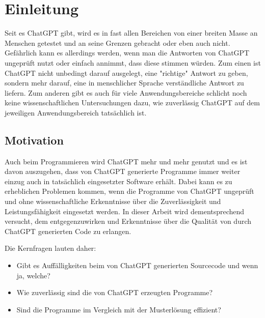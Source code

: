 \documentclass[class=scrbook, crop=false]{standalone}
\begin{document}
\chapter{Einleitung}
\label{ch::einleitung}
    Seit es ChatGPT gibt, wird es in fast allen Bereichen von einer breiten Masse an Menschen getestet und an seine Grenzen gebracht oder eben auch nicht.
    Gefährlich kann es allerdings werden, wenn man die Antworten von ChatGPT ungeprüft nutzt oder einfach annimmt, dass diese stimmen würden.
    Zum einen ist ChatGPT nicht unbedingt darauf ausgelegt, eine "richtige" Antwort zu geben, sondern mehr darauf, eine in menschlicher Sprache verständliche
    Antwort zu liefern. Zum anderen gibt es auch für viele Anwendungsbereiche schlicht noch keine wissenschaftlichen
    Untersuchungen dazu, wie zuverlässig ChatGPT auf dem jeweiligen Anwendungsbereich tatsächlich ist.

\section{Motivation}
\label{sec:motivation}
    Auch beim Programmieren wird ChatGPT mehr und mehr genutzt und es ist davon auszugehen, dass von ChatGPT generierte
    Programme immer weiter einzug auch in tatsächlich eingesetzter Software erhält.
    Dabei kann es zu erheblichen Problemen kommen, wenn die Programme von ChatGPT ungeprüft und ohne wissenschaftliche
    Erkenntnisse über die Zuverlässigkeit und Leistungsfähigkeit eingesetzt werden.
    In dieser Arbeit wird dementsprechend versucht, dem entgegenzuwirken und Erkenntnisse über die Qualität von durch
    ChatGPT generierten Code zu erlangen.

    Die Kernfragen lauten daher:
    \begin{itemize}
        \item Gibt es Auffälligkeiten beim von ChatGPT generierten Sourcecode und wenn ja, welche?
        \item Wie zuverlässig sind die von ChatGPT erzeugten Programme?
        \item Sind die Programme im Vergleich mit der Musterlösung effizient?
    \end{itemize}

\ifstandalone
    \printglossary
    \printbibliography[heading=bibintoc]
\fi
\end{document}
